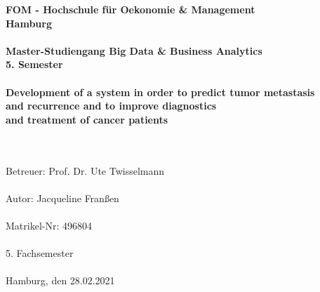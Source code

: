 		\begin{titlepage}
			\begin{center}
			\renewcommand{\baselinestretch}{1.5}
					\textbf{\large FOM - Hochschule für Oekonomie \& Management \\
						Hamburg \\
						\ \\
						Master-Studiengang Big Data \& Business Analytics \\
						5. Semester \\
						\ \\
						Development of a system in order to predict tumor metastasis \\
						 and recurrence and to improve diagnostics \\
						 and treatment of cancer patients \ \\
						\ \\
						}
						
					\textrm{
						\ \\
						Betreuer: Prof. Dr. Ute Twisselmann \\
						\ \\
						Autor: Jacqueline Franßen \\
						\ \\
						Matrikel-Nr: 496804 \\
						\ \\
						5. Fachsemester \\
						\ \\
						Hamburg, den 28.02.2021 \\
						}
			\end{center}
		\end{titlepage}

%

			\setcounter{tocdepth}{3}
			\setcounter{secnumdepth}{3}		
			\thispagestyle{empty}
			\tableofcontents
			\newpage
			\listoffigures
			\listoftables

			\thispagestyle{empty}